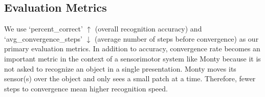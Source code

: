 \documentclass[runningheads]{llncs}
\begin{document}
\subsection{Evaluation Metrics}

We use `percent\_correct' $\uparrow$ (overall recognition accuracy) and `avg\_convergence\_steps' $\downarrow$ (average number of steps before convergence) as our primary evaluation metrics. In addition to accuracy, convergence rate becomes an important metric in the context of a sensorimotor system like Monty because it is not asked to recognize an object in a single presentation. Monty moves its sensor(s) over the object and only sees a small patch at a time. Therefore, fewer steps to convergence mean higher recognition speed. 
\end{document}
